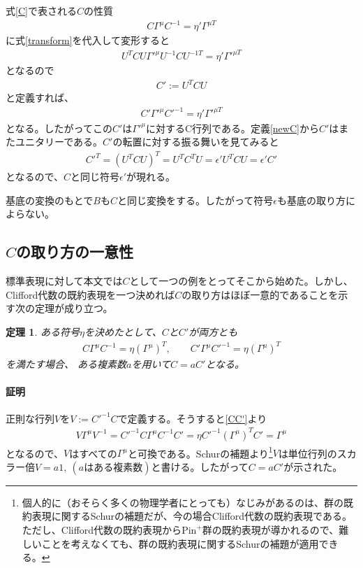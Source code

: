 \documentclass[12pt,a4paper,dvipdfmx]{jlreq}
\newcommand{\Pin}{\mathrm{Pin}^{+}}
\newtheorem{theo}{定理}
\begin{document}
式\eqref{C}で表される$C$の性質
\begin{align*}
  C\Gamma^{\mu}C^{-1}=\eta'\Gamma^{\mu T}
\end{align*}
に式\eqref{transform}を代入して変形すると
\begin{align*}
  U^{T}C U \Gamma'^{\mu} U^{-1}CU^{-1 T}=\eta'\Gamma'^{\mu T}
\end{align*}
となるので
\begin{align}
  C':=U^{T}C U\label{newC}
\end{align}
と定義すれば、
\begin{align*}
  C' \Gamma'^{\mu} C'^{-1}=\eta'\Gamma'^{\mu T}
\end{align*}
となる。したがってこの$C'$は$\Gamma'^{\mu}$に対するC行列である。定義\eqref{newC}から$C'$はまたユニタリーである。$C'$の転置に対する振る舞いを見てみると
\begin{align*}
  C'^{T}=(U^T C U)^{T}
  =U^T C^T U
  =\epsilon'U^T C U
  =\epsilon' C'
\end{align*}
となるので、$C$と同じ符号$\epsilon'$が現れる。

基底の変換のもとで$B$も$C$と同じ変換をする。したがって符号$\epsilon$も基底の取り方によらない。

\subsection{$C$の取り方の一意性}
標準表現に対して本文では$C$として一つの例をとってそこから始めた。しかし、Clifford代数の既約表現を一つ決めれば$C$の取り方はほぼ一意的であることを示す次の定理が成り立つ。
\begin{theo}
  ある符号$\eta$を決めたとして、$C$と$C'$が両方とも
\begin{align}
  C\Gamma^{\mu}C^{-1}=\eta (\Gamma^{\mu})^{T},\qquad  C'\Gamma^{\mu}C'^{-1}=\eta (\Gamma^{\mu})^{T}
  \label{CC'}
\end{align}
を満たす場合、
  ある複素数$a$を用いて$C=a C'$となる。
\end{theo}

\paragraph{証明} 正則な行列$V$を$V:=C'^{-1}C$で定義する。そうすると\eqref{CC'}より
\begin{align}
  V\Gamma^{\mu} V^{-1} 
  =C'^{-1}C\Gamma^{\mu}C^{-1} C'
  =\eta C'^{-1}(\Gamma^{\mu})^{T} C'
  =\Gamma^{\mu}
\end{align}
となるので、$V$はすべての$\Gamma^{\mu}$と可換である。Schurの補題より\footnote{個人的に（おそらく多くの物理学者にとっても）なじみがあるのは、群の既約表現に関するSchurの補題だが、今の場合Clifford代数の既約表現である。ただし、Clifford代数の既約表現から$\Pin$群の既約表現が導かれるので、難しいことを考えなくても、群の既約表現に関するSchurの補題が適用できる。}$V$は単位行列のスカラー倍$V=a 1,\ (a \text{はある複素数})$と書ける。したがって$C=aC'$が示された。
\end{document}
